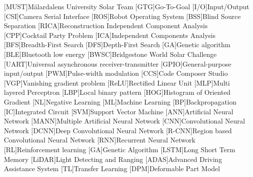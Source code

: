 


[MUST]{Mälardalens University Solar Team}
[GTG]{Go-To-Goal}
[I/O]{Input/Output}
[CSI]{Camera Serial Interface}
[ROS]{Robot Operating System}
[BSS]{Blind Source Separation}
[RICA]{Reconstruction Independent Component Analysis}
[CPP]{Cocktail Party Problem}
[ICA]{Independent Components Analysis}
[BFS]{Breadth-First  Search}
[DFS]{Depth-First  Search}
[GA]{Genetic algorithm}
[BLE]{Bluetooth low energy}
[BWSC]{Bridgestone World Solar Challenge}
[UART]{Universal asynchronous receiver-transmitter}
[GPIO]{General-purpose input/output}
[PWM]{Pulse-width modulation}
[CCS]{Code Composer Studio}
[VGP]{Vanishing gradient problem}
[ReLU]{Rectified Linear Unit}
[MLP]{Multi layered Perceptron}
[LBP]{Local binary pattern}
[HOG]{Histogram of Oriented Gradient}
[NL]{Negative Learning}
[ML]{Machine Learning}
[BP]{Backpropagation}
[IC]{Integrated Circuit}
[SVM]{Support Vector Machine}
[ANN]{Artificial Neural Network}
[MANN]{Multiple Artificial Neural Network}
[CNN]{Convolutional Neural Network}
[DCNN]{Deep Convolutional Neural Network}
[R-CNN]{Region based Convolutional Neural Network}
[RNN]{Recurrent Neural Network}
[RL]{Reinforcement learning}
[GA]{Genetic Algorithm}
[LSTM]{Long Short Term Memory}
[LiDAR]{Light Detecting and Ranging}
[ADAS]{Advanced Driving Assistance System}
[TL]{Transfer Learning}
[DPM]{Deformable Part Model}

